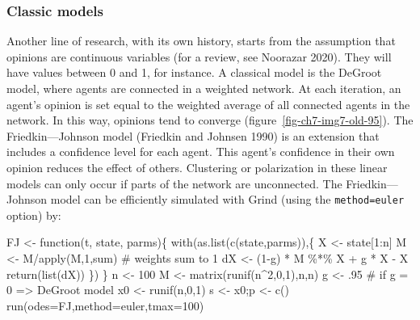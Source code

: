 \documentclass[
  a4paper,
  DIV=11,
  numbers=noendperiod,
  oneside]{scrreprt}
\newenvironment{Shaded}{}{}
\newcommand{\AttributeTok}[1]{\textcolor[rgb]{0.84,0.23,0.29}{#1}}
\newcommand{\CommentTok}[1]{\textcolor[rgb]{0.42,0.45,0.49}{#1}}
\newcommand{\ControlFlowTok}[1]{\textcolor[rgb]{0.84,0.23,0.29}{#1}}
\newcommand{\DecValTok}[1]{\textcolor[rgb]{0.00,0.36,0.77}{#1}}
\newcommand{\FunctionTok}[1]{\textcolor[rgb]{0.44,0.26,0.76}{#1}}
\newcommand{\NormalTok}[1]{\textcolor[rgb]{0.14,0.16,0.18}{#1}}
\newcommand{\OtherTok}[1]{\textcolor[rgb]{0.44,0.26,0.76}{#1}}
\newcommand{\SpecialCharTok}[1]{\textcolor[rgb]{0.00,0.36,0.77}{#1}}
\newcommand{\StringTok}[1]{\textcolor[rgb]{0.01,0.18,0.38}{#1}}
\begin{document}
\subsubsection{Classic models}\label{sec-Classic-models}

Another line of research, with its own history, starts from the
assumption that opinions are continuous variables (for a review, see
Noorazar 2020). They will have values between 0 and 1, for instance. A
classical model is the DeGroot model, where agents are connected in a
weighted network. At each iteration, an agent's opinion is set equal to
the weighted average of all connected agents in the network. In this
way, opinions tend to converge (figure~\ref{fig-ch7-img7-old-95}). The
Friedkin---Johnson model (Friedkin and Johnsen 1990) is an extension
that includes a confidence level for each agent. This agent's confidence
in their own opinion reduces the effect of others. Clustering or
polarization in these linear models can only occur if parts of the
network are unconnected. The Friedkin---Johnson model can be efficiently
simulated with Grind (using the
\texttt{method=\textquotesingle{}euler\textquotesingle{}} option) by:

\begin{Shaded}
\begin{Highlighting}[]
\NormalTok{FJ }\OtherTok{\textless{}{-}} \ControlFlowTok{function}\NormalTok{(t, state, parms)\{}
  \FunctionTok{with}\NormalTok{(}\FunctionTok{as.list}\NormalTok{(}\FunctionTok{c}\NormalTok{(state,parms)),\{}
\NormalTok{    X }\OtherTok{\textless{}{-}}\NormalTok{ state[}\DecValTok{1}\SpecialCharTok{:}\NormalTok{n]}
\NormalTok{    M }\OtherTok{\textless{}{-}}\NormalTok{ M}\SpecialCharTok{/}\FunctionTok{apply}\NormalTok{(M,}\DecValTok{1}\NormalTok{,sum) }\CommentTok{\# weights sum to 1}
\NormalTok{    dX }\OtherTok{\textless{}{-}}\NormalTok{ (}\DecValTok{1}\SpecialCharTok{{-}}\NormalTok{g) }\SpecialCharTok{*}\NormalTok{ M }\SpecialCharTok{\%*\%}\NormalTok{ X  }\SpecialCharTok{+}\NormalTok{ g }\SpecialCharTok{*}\NormalTok{ X }\SpecialCharTok{{-}}\NormalTok{ X}
    \FunctionTok{return}\NormalTok{(}\FunctionTok{list}\NormalTok{(dX))}
\NormalTok{  \})}
\NormalTok{\}}
\NormalTok{n }\OtherTok{\textless{}{-}} \DecValTok{100}
\NormalTok{M }\OtherTok{\textless{}{-}} \FunctionTok{matrix}\NormalTok{(}\FunctionTok{runif}\NormalTok{(n}\SpecialCharTok{\^{}}\DecValTok{2}\NormalTok{,}\DecValTok{0}\NormalTok{,}\DecValTok{1}\NormalTok{),n,n)}
\NormalTok{g }\OtherTok{\textless{}{-}}\NormalTok{ .}\DecValTok{95} \CommentTok{\# if g  = 0 =\textgreater{} DeGroot model}
\NormalTok{x0 }\OtherTok{\textless{}{-}} \FunctionTok{runif}\NormalTok{(n,}\DecValTok{0}\NormalTok{,}\DecValTok{1}\NormalTok{)}
\NormalTok{s }\OtherTok{\textless{}{-}}\NormalTok{ x0;p  }\OtherTok{\textless{}{-}} \FunctionTok{c}\NormalTok{() }
\FunctionTok{run}\NormalTok{(}\AttributeTok{odes=}\NormalTok{FJ,}\AttributeTok{method=}\StringTok{\textquotesingle{}euler\textquotesingle{}}\NormalTok{,}\AttributeTok{tmax=}\DecValTok{100}\NormalTok{)}
\end{Highlighting}
\end{Shaded}
\end{document}
